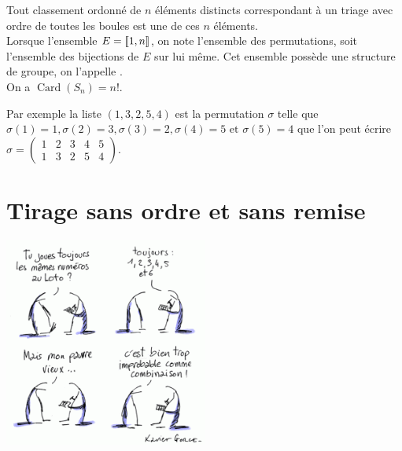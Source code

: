 \documentclass{book}
\begin{document}
\begin{DefinitionProposition}[Permutation (cas n=p)]
Tout classement ordonné de $n$ éléments distincts correspondant à un triage avec ordre de toutes les boules est une  de ces $n$
éléments. \\
Lorsque l'ensemble $E = \mathopen\lbrack\!\lbrack1,n \mathclose\rbrack\!\rbrack$, on note  l'ensemble des permutations, soit l'ensemble des bijections de $E$ sur lui même. Cet ensemble possède une structure de groupe, on l'appelle .\\
On a $\operatorname{Card}(S_n)=n!$.
\end{DefinitionProposition}
\begin{Exemple} Par exemple la liste $(1,3,2,5,4)$ est la permutation $\sigma$ telle que $\sigma(1)=1, \sigma(2)=3, \sigma(3)=2, \sigma(4)=5 \text{ et }\sigma(5)=4$ que l'on peut écrire   
$\sigma =\begin{pmatrix}
1 & 2 & 3 & 4 & 5 \\
1 & 3 & 2 & 5 & 4
\end{pmatrix}$.
\end{Exemple} 
\section{Tirage sans ordre et sans remise}
\begin{center}
\includegraphics[width=0.5\textwidth]{bd_combinatoire.png}
\end{center}
\end{document}
